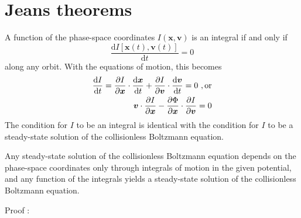 \documentclass[12pt,a4paper]{article}
\renewcommand{\vec}[1]{\boldsymbol{#1}}
\newcommand{\dif}{\mathrm{d}}
\newcounter{theo}[section]\setcounter{theo}{0}
\renewcommand{\thetheo}{\arabic{section}.\arabic{theo}}
\newenvironment{theo}[2][]{%
\refstepcounter{theo}%
\ifstrempty{#1}%
{\mdfsetup{%
frametitle={%
\tikz[baseline=(current bounding box.east),outer sep=0pt]
\node[anchor=east,rectangle,fill=blue!20]
{\strut Theorem~\thetheo};}}
}%
{\mdfsetup{%
frametitle={%
\tikz[baseline=(current bounding box.east),outer sep=0pt]
\node[anchor=east,rectangle,fill=blue!20]
{\strut Theorem~\thetheo:~#1};}}%
}%
\mdfsetup{innertopmargin=10pt,linecolor=blue!20,%
linewidth=2pt,topline=true,%
frametitleaboveskip=\dimexpr-\ht\strutbox\relax
}
\begin{mdframed}[]\relax%
\label{#2}}{\end{mdframed}}
\begin{document}
\section{Jeans theorems}
A function of the phase-space coordinates $I(\vec{x}, \vec{v})$ is an integral if and only if
\begin{equation}
\frac{\dif I[\vec{x}(t), \vec{v}(t)]}{\dif t} = 0
\end{equation}
along any orbit. With the equations of motion, this becomes
\begin{eqnarray*}
\frac{\dif I}{\dif t} = \frac{\partial I}{\partial \vec{x} } \cdot  \frac{\dif\vec{x}}{\dif t}  +\frac{\partial I}{\partial \vec{v} } \cdot  \frac{\dif\vec{v}}{\dif t} = 0 ~, {\rm or }\\
\vec{v} \cdot \frac{\partial I}{\partial \vec{x} } -\frac{\partial \Phi}{\partial \vec{x}}\cdot \frac{\partial I}{\partial \vec{v}} = 0
\end{eqnarray*}
The condition for $I$ to be an integral is identical with the condition for $I$ to be a steady-state solution of the collisionless Boltzmann equation.
\begin{tcolorbox}[colback=green!5,colframe=green!40!black,title=Jeans theorem]
Any steady-state solution of the collisionless Boltzmann equation depends on the phase-space coordinates only through integrals of motion in the given potential, and any function of the integrals yields a steady-state solution of the collisionless Boltzmann equation.
\end{tcolorbox}
Proof : 
\end{document}
